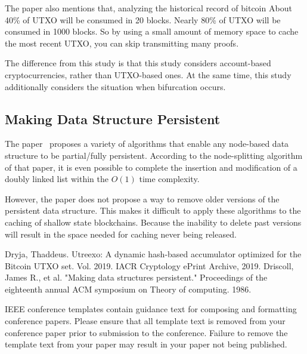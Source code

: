 \documentclass[conference]{IEEEtran}
\begin{document}
The paper also mentions that, analyzing the historical record of bitcoin
About 40\% of UTXO will be consumed in 20 blocks.
Nearly 80\% of UTXO will be consumed in 1000 blocks.
So by using a small amount of memory space to cache the most recent UTXO, you can skip transmitting many proofs.

The difference from this study is that this study considers account-based cryptocurrencies, rather than UTXO-based ones.
At the same time, this study additionally considers the situation when bifurcation occurs.

\subsection{Making Data Structure Persistent}

The paper~\cite{b2} proposes a variety of algorithms that enable any node-based data structure to be partial/fully persistent.
According to the node-splitting algorithm of that paper, it is even possible to complete the insertion and modification of a doubly linked list within the $O(1)$ time complexity.

However, the paper does not propose a way to remove older versions of the persistent data structure.
This makes it difficult to apply these algorithms to the caching of shallow state blockchains.
Because the inability to delete past versions will result in the space needed for caching never being released.


\begin{thebibliography}{00}
 Dryja, Thaddeus. Utreexo: A dynamic hash-based accumulator optimized for the Bitcoin UTXO set. Vol. 2019. IACR Cryptology ePrint Archive, 2019.
 Driscoll, James R., et al. "Making data structures persistent." Proceedings of the eighteenth annual ACM symposium on Theory of computing. 1986.
\end{thebibliography}
\vspace{12pt}
\color{red}
IEEE conference templates contain guidance text for composing and formatting conference papers. Please ensure that all template text is removed from your conference paper prior to submission to the conference. Failure to remove the template text from your paper may result in your paper not being published.
\end{document}
